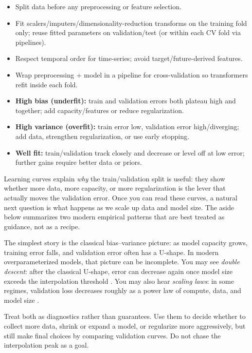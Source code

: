 \begin{tcolorbox}[summarybox, title={Data-leakage checklist}]
\begin{itemize}
    \item Split data before any preprocessing or feature selection.
    \item Fit scalers/imputers/dimensionality-reduction transforms on the training fold only; reuse fitted parameters on validation/test (or within each CV fold via pipelines).
    \item Respect temporal order for time-series; avoid target/future-derived features.
    \item Wrap preprocessing + model in a pipeline for cross-validation so transformers refit inside each fold.
\end{itemize}
\end{tcolorbox}

\begin{tcolorbox}[summarybox, title={Bias--variance at a glance}]
\begin{itemize}
    \item \textbf{High bias (underfit):} train and validation errors both plateau high and together; add capacity/features or reduce regularization.
    \item \textbf{High variance (overfit):} train error low, validation error high/diverging; add data, strengthen regularization, or use early stopping.
    \item \textbf{Well fit:} train/validation track closely and decrease or level off at low error; further gains require better data or priors.
\end{itemize}
\end{tcolorbox}

\noindent Learning curves explain \emph{why} the train/validation split is useful: they show whether more data, more capacity, or more regularization is the lever that actually moves the validation error. Once you can read these curves, a natural next question is what happens as we scale up data and model size. The aside below summarizes two modern empirical patterns that are best treated as guidance, not as a recipe.

\begin{tcolorbox}[summarybox, title={Aside: scaling laws and double descent}]
The simplest story is the classical bias--variance picture: as model capacity grows, training error falls, and validation error often has a U-shape. In modern overparameterized models, that picture can be incomplete. You may see \emph{double descent}: after the classical U-shape, error can decrease again once model size exceeds the interpolation threshold \citep{Belkin2019}. You may also hear \emph{scaling laws}: in some regimes, validation loss decreases roughly as a power law of compute, data, and model size \citep{Kaplan2020,Hoffmann2022}.

Treat both as diagnostics rather than guarantees. Use them to decide whether to collect more data, shrink or expand a model, or regularize more aggressively, but still make final choices by comparing validation curves. Do not chase the interpolation peak as a goal.
\end{tcolorbox}

